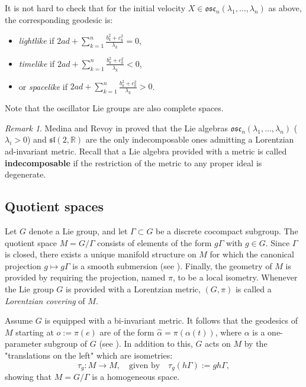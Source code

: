 \documentclass[12pt]{amsart}
\theoremstyle{plain}
\theoremstyle{definition}
\theoremstyle{remark}
\newtheorem{rem}{Remark}
\begin{document}
It is not hard to check that for the initial velocity \( X \in \mathfrak{osc}_n(\lambda_1, \ldots, \lambda_n) \) as above, the corresponding geodesic is:
\begin{itemize}
    \item \textit{lightlike} if \( 2ad + \sum_{k=1}^{n} \frac{b_k^2 + c_k^2}{\lambda_k} = 0 \),
    \item \textit{timelike} if \( 2ad + \sum_{k=1}^{n} \frac{b_k^2 + c_k^2}{\lambda_k} < 0 \),
    \item or \textit{spacelike} if \( 2ad + \sum_{k=1}^{n} \frac{b_k^2 + c_k^2}{\lambda_k} > 0 \).
\end{itemize}

Note that the oscillator Lie groups are also complete spaces.
\smallskip

\begin{rem}
    Medina and Revoy in \cite{Me,MeRe} proved that the Lie algebras \( \mathfrak{osc}_n(\lambda_1, \ldots, \lambda_n) \) (\( \lambda_i > 0 \)) and \( \mathfrak{sl}(2, \mathbb{R}) \) are the only indecomposable ones admitting a Lorentzian ad-invariant metric. Recall that a Lie algebra provided with a metric is called \textbf{indecomposable} if the restriction of the metric to any proper ideal is degenerate.
\end{rem}

\subsection{Quotient spaces}

Let \( G \) denote a Lie group, and let \( \Gamma \subset G \) be a discrete cocompact subgroup. The quotient space \( M = G/\Gamma \) consists of elements of the form \( g\Gamma \) with \( g \in G \). Since \( \Gamma \) is closed, there exists a unique manifold structure on \( M \) for which the canonical projection \( g \mapsto g\Gamma \) is a smooth submersion (see \cite{Hel}). Finally, the geometry of \( M \) is provided by requiring the projection, named \( \pi \), to be a local isometry. Whenever the Lie group \( G \) is provided with a Lorentzian metric, \( (G, \pi) \) is called a \textit{Lorentzian covering} of \( M \).

Assume \( G \) is equipped with a bi-invariant metric. It follows that the geodesics of \( M \) starting at \( o := \pi(e) \) are of the form \( \hat{\alpha} = \pi(\alpha(t)) \), where \( \alpha \) is a one-parameter subgroup of \( G \) (see \cite{ON}). In addition to this, \( G \) acts on \( M \) by the "translations on the left" which are isometries:
\begin{equation*}
    \tau_g : M \rightarrow M, \quad \text{given by} \quad \tau_g(h\Gamma) := gh\Gamma,
\end{equation*}
showing that \( M = G/\Gamma \) is a homogeneous space.
\end{document}
